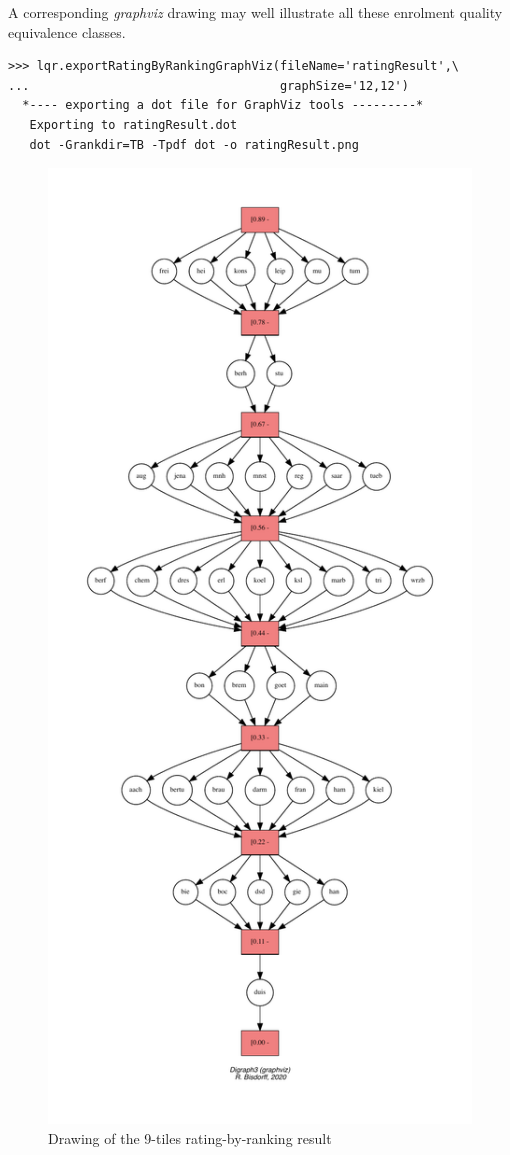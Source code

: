A corresponding \emph{graphviz} drawing may well illustrate all these enrolment quality equivalence classes.
\begin{lstlisting}
>>> lqr.exportRatingByRankingGraphViz(fileName='ratingResult',\
...                                   graphSize='12,12')
  *---- exporting a dot file for GraphViz tools ---------*
   Exporting to ratingResult.dot
   dot -Grankdir=TB -Tpdf dot -o ratingResult.png
\end{lstlisting}
\begin{figure}[ht]
\includegraphics[height=0.95\vsize]{Figures/14-5-ratingResult.pdf}
\caption{Drawing of the 9-tiles rating-by-ranking result}
\label{fig:14.5}       %
\end{figure}
\clearpage 

